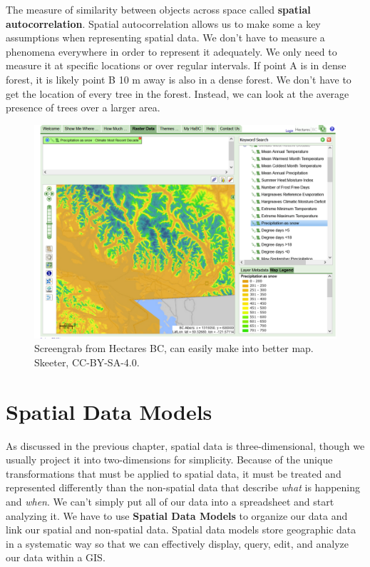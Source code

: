 \documentclass[
]{book}
\begin{document}
The measure of similarity between objects across space called \textbf{spatial autocorrelation}. Spatial autocorrelation allows us to make some a key assumptions when representing spatial data. We don't have to measure a phenomena everywhere in order to represent it adequately. We only need to measure it at specific locations or over regular intervals. If point A is in dense forest, it is likely point B 10 m away is also in a dense forest. We don't have to get the location of every tree in the forest. Instead, we can look at the average presence of trees over a larger area.

\begin{figure}
\includegraphics[width=0.75\linewidth]{images/03-bc-snow} \caption{Screengrab from Hectares BC, can easily make into better map. Skeeter, CC-BY-SA-4.0.}\label{fig:3-bc-snow}
\end{figure}

\hypertarget{spatial-data-models}{%
\section{Spatial Data Models}\label{spatial-data-models}}

As discussed in the previous chapter, spatial data is three-dimensional, though we usually project it into two-dimensions for simplicity. Because of the unique transformations that must be applied to spatial data, it must be treated and represented differently than the non-spatial data that describe \emph{what} is happening and \emph{when}. We can't simply put all of our data into a spreadsheet and start analyzing it. We have to use \textbf{Spatial Data Models} to organize our data and link our spatial and non-spatial data. Spatial data models store geographic data in a systematic way so that we can effectively display, query, edit, and analyze our data within a GIS.
\end{document}
